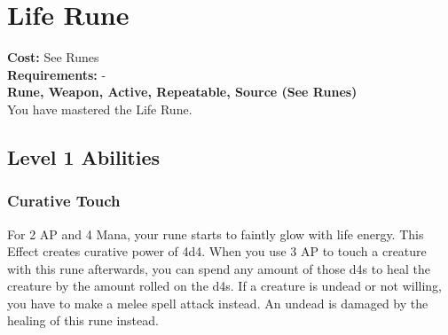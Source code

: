 \twocolumn
\section{Life Rune}\label{rune:life}
\textbf{Cost:} See Runes\\
\textbf{Requirements:} -\\
\textbf{Rune, Weapon, Active, Repeatable, Source (See Runes)}\\
You have mastered the Life Rune.

\subsection{Level 1 Abilities}

\subsubsection{Curative Touch}
For 2 AP and 4 Mana, your rune starts to faintly glow with life energy.
This Effect creates curative power of 4d4.
When you use 3 AP to touch a creature with this rune afterwards, you can spend any amount of those d4s to heal the creature by the amount rolled on the d4s.
If a creature is undead or not willing, you have to make a melee spell attack instead.
An undead is damaged by the healing of this rune instead.